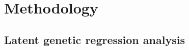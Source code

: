 \documentclass[12pt]{article}
\begin{document}





\vspace{-3.5mm}

\section{Methodology}\label{sec:methods}
\vspace{-3.5mm}



\subsection{Latent genetic regression analysis}

\end{document}

